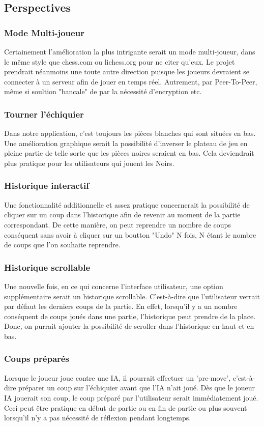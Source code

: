 \documentclass{article}
\begin{document}
\subsection{Perspectives}
\subsubsection{Mode Multi-joueur}
Certainement l'amélioration la plus intrigante serait un mode multi-joueur, dans le même style que chess.com ou lichess.org pour ne citer qu'eux.
Le projet prendrait néanmoins une toute autre direction puisque les joueurs devraient se connecter à un serveur afin de jouer en temps réel. Autrement,
par Peer-To-Peer, même si soultion "bancale" de par la nécessité d'encryption etc.

\subsubsection{Tourner l'échiquier}
Dans notre application, c'est toujours les pièces blanches qui sont situées en bas. Une amélioration graphique serait la possibilité d'inverser le plateau
de jeu en pleine partie de telle sorte que les pièces noires seraient en bas. Cela deviendrait plus pratique pour les utilisateurs qui jouent les Noirs.

\subsubsection{Historique interactif}
Une fonctionnalité additionnelle et assez pratique concernerait la possibilité de cliquer sur un coup dans l'historique afin de revenir au moment de la 
partie correspondant. De cette manière, on peut reprendre un nombre de coups conséquent sans avoir à cliquer sur un boutton "Undo" N fois, N étant le nombre 
de coups que l'on souhaite reprendre.

\subsubsection{Historique scrollable}
Une nouvelle fois, en ce qui concerne l'interface utilisateur, une option supplémentaire serait un historique scrollable. C'est-à-dire que l'utilisateur 
verrait par défaut les derniers coups de la partie. En effet, lorsqu'il y a un nombre conséquent de coups joués dans une partie, l'historique peut prendre 
de la place. Donc, on purrait ajouter la possibilité de scroller dans l'historique en haut et en bas.

\subsubsection{Coups préparés}
Lorsque le joueur joue contre une IA, il pourrait effectuer un 'pre-move', c'est-à-dire préparer un coup sur l'échiquier avant que l'IA n'ait joué. Dès que 
le joueur IA jouerait son coup, le coup préparé par l'utilisateur serait immédiatement joué. Ceci peut être pratique en début de partie ou en fin de partie 
ou plus souvent lorsqu'il n'y a pas nécessité de réflexion pendant longtemps.
\end{document}
